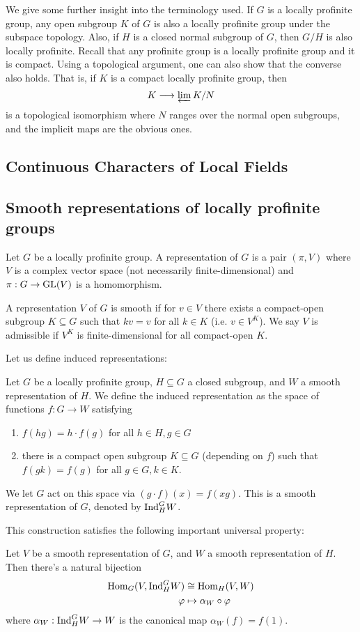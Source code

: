 We give some further insight into the terminology used. If $G$ is a locally profinite group, any open subgroup $K$ of $G$ is also a locally profinite group under the subspace topology. Also, if $H$ is a closed normal subgroup of $G$, then $G/H$ is also locally profinite. Recall that any profinite group is a locally profinite group and it is compact. Using a topological argument, one can also show that the converse also holds. That is, if $K$ is a compact locally profinite group, then
$$K\longrightarrow\varprojlim K/N$$
is a topological isomorphism where $N$ ranges over the normal open subgroups, and the implicit maps are the obvious ones.

\subsection{Continuous Characters of Local Fields}
\subsection{Smooth representations of locally profinite groups}

Let $G$ be a locally profinite group. A representation of $G$ is a pair $(\pi, V)$ where $V$ is a complex vector space (not necessarily finite-dimensional) and $\pi: G \to \mathrm{GL}(V)$ is a homomorphism.
\begin{defn}
	A representation $V$ of $G$ is smooth if for $v\in V$ there exists a compact-open subgroup $K\subseteq G$ such that $kv = v$ for all $k\in K$ (i.e. $v\in V^K$). We say $V$ is admissible if $V^K$ is finite-dimensional for all compact-open $K$.
\end{defn}

Let us define induced representations:
\begin{defn}\label{induction}
	Let $G$ be a locally profinite group, $H\subseteq G$ a closed subgroup, and $W$ a smooth representation of $H$. We define the induced representation as the space of functions $f: G\to W$ satisfying
	\begin{enumerate}
		\item $f(hg) = h\cdot f(g)$ for all $h\in H, g\in G$
		\item there is a compact open subgroup $K\subseteq G$ (depending on $f$) such that $f(gk) = f(g)$ for all $g\in G, k\in K$.
	\end{enumerate}
	We let $G$ act on this space via $(g\cdot f)(x) = f(xg)$. This is a smooth representation of $G$, denoted by $\mathrm{Ind}_H^G W$.
\end{defn}
This construction satisfies the following important universal property:
\begin{thm}
	Let $V$ be a smooth representation of $G$, and $W$ a smooth representation of $H$. Then there's a natural bijection
	\begin{align*}
		\mathrm{Hom}_G(V, \mathrm{Ind}_H^G W)&\cong \mathrm{Hom}_H(V, W)\\
		\varphi &\mapsto \alpha_W \circ \varphi
	\end{align*}
	where $\alpha_W: \mathrm{Ind}_H^G W \to W$ is the canonical map $\alpha_W(f) = f(1)$.
\end{thm}

